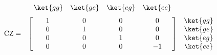 \documentclass[a4paper,11pt]{article} %
\begin{document}
\begin{equation*} \label{ec_ions_CZ}
 \begin{matrix}
    & 
    \begin{matrix}
      \ket{gg} & 
      \ket{ge} & 
      \ket{eg} &
      \ket{ee}
    \end{matrix} 	&  \\[.5\normalbaselineskip]
    \text{CZ} = & 
    \begin{bmatrix}
        \makebox[\widthof{$\ket{gg}$}]{$1$} & 
        \makebox[\widthof{$\ket{gg}$}]{$0$} & 
        \makebox[\widthof{$\ket{gg}$}]{$0$} & 
        \makebox[\widthof{$\ket{gg}$}]{$0$} \\
        \makebox[\widthof{$\ket{gg}$}]{$0$} & 
        \makebox[\widthof{$\ket{gg}$}]{$1$} & 
        \makebox[\widthof{$\ket{gg}$}]{$0$} & 
        \makebox[\widthof{$\ket{gg}$}]{$0$} \\
        \makebox[\widthof{$\ket{gg}$}]{$0$} & 
        \makebox[\widthof{$\ket{gg}$}]{$0$} & 
        \makebox[\widthof{$\ket{gg}$}]{$1$} & 
        \makebox[\widthof{$\ket{gg}$}]{$0$} \\
        \makebox[\widthof{$\ket{gg}$}]{$0$} & 
        \makebox[\widthof{$\ket{gg}$}]{$0$} & 
        \makebox[\widthof{$\ket{gg}$}]{$0$} & 
        \makebox[\widthof{$\ket{gg}$}]{$-1$} \\
    \end{bmatrix} &
    \begin{matrix} \ket{gg} \\ \ket{ge} \\ \ket{eg} \\ \ket{ee} \end{matrix} 
\end{matrix} \,
\end{equation*}
\end{document}
